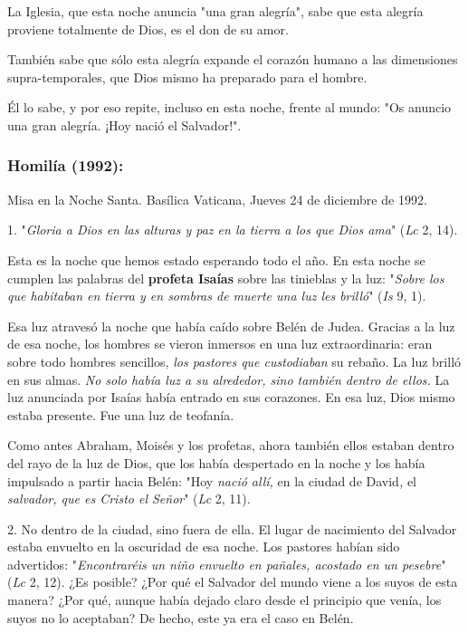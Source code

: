 \begin{body}
\begin{body}
La Iglesia, que esta noche anuncia "una gran alegría", sabe que esta alegría proviene totalmente de Dios, es el don de su amor.

También sabe que sólo esta alegría expande el corazón humano a las dimensiones supra-temporales, que Dios mismo ha preparado para el hombre.

Él lo sabe, y por eso repite, incluso en esta noche, frente al mundo: "Os anuncio una gran alegría. ¡Hoy nació el Salvador!".
\end{body} 
	
\subsubsection{Homilía (1992): }

Misa en la Noche Santa. Basílica Vaticana, Jueves 24 de diciembre de 1992.

\begin{body} 
1. "\emph{Gloria a Dios en las alturas y paz en la tierra a los que Dios ama}" (\emph{Lc} 2, 14).

Esta es la noche que hemos estado esperando todo el año. En esta noche se cumplen las palabras del \textbf{profeta Isaías} sobre las tinieblas y la luz: "\emph{Sobre los que habitaban en tierra y en sombras de muerte una luz les brilló}" (\emph{Is} 9, 1).

Esa luz atravesó la noche que había caído sobre Belén de Judea. Gracias a la luz de esa noche, los hombres se vieron inmersos en una luz extraordinaria: eran sobre todo hombres sencillos, \emph{los pastores que custodiaban} su rebaño. La luz brilló en sus almas. \emph{No solo había luz a su alrededor, sino también dentro de ellos.} La luz anunciada por Isaías había entrado en sus corazones. En esa luz, Dios mismo estaba presente. Fue una luz de teofanía.

Como antes Abraham, Moisés y los profetas, ahora también ellos estaban dentro del rayo de la luz de Dios, que los había despertado en la noche y los había impulsado a partir hacia Belén: "Hoy \emph{nació allí,} en la ciudad de David\emph{,} el \emph{salvador, que es Cristo el Señor}" (\emph{Lc} 2, 11).

2. No dentro de la ciudad, sino fuera de ella. El lugar de nacimiento del Salvador estaba envuelto en la oscuridad de esa noche. Los pastores habían sido advertidos: "\emph{Encontraréis un niño envuelto en pañales, acostado en un pesebre}" (\emph{Lc} 2, 12). ¿Es posible? ¿Por qué el Salvador del mundo viene a los suyos de esta manera? ¿Por qué, aunque había dejado claro desde el principio que venía, los suyos no lo aceptaban? De hecho, este ya era el caso en Belén.


\end{body}
\end{body}
